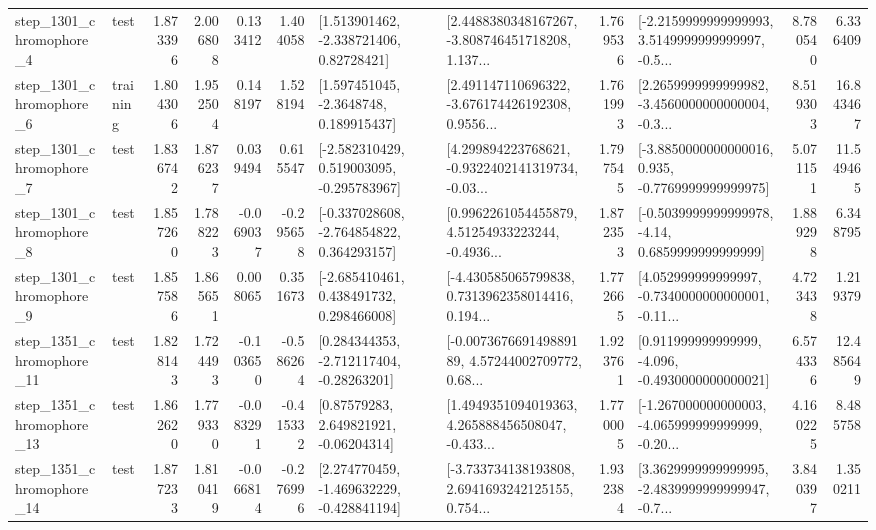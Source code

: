 \begin{tabular}{llrrrrllrlrr}
  step\_1301\_chromophore\_4 &      test &      1.873396 &    2.006808 &      0.133412 &  1.404058 &     [1.513901462, -2.338721406, 0.82728421] &  [2.4488380348167267, -3.808746451718208, 1.137... &       1.769536 &  [-2.2159999999999993, 3.5149999999999997, -0.5... &            8.780540 &          6.336409 \\
  step\_1301\_chromophore\_6 &  training &      1.804306 &    1.952504 &      0.148197 &  1.528194 &      [1.597451045, -2.3648748, 0.189915437] &  [2.491147110696322, -3.676174426192308, 0.9556... &       1.761993 &  [2.2659999999999982, -3.4560000000000004, -0.3... &            8.519303 &         16.843467 \\
  step\_1301\_chromophore\_7 &      test &      1.836742 &    1.876237 &      0.039494 &  0.615547 &   [-2.582310429, 0.519003095, -0.295783967] &  [4.299894223768621, -0.9322402141319734, -0.03... &       1.797545 &  [-3.8850000000000016, 0.935, -0.7769999999999975] &            5.071151 &         11.549465 \\
  step\_1301\_chromophore\_8 &      test &      1.857260 &    1.788223 &     -0.069037 & -0.295658 &   [-0.337028608, -2.764854822, 0.364293157] &  [0.9962261054455879, 4.51254933223244, -0.4936... &       1.872353 &   [-0.5039999999999978, -4.14, 0.6859999999999999] &            1.889298 &          6.348795 \\
  step\_1301\_chromophore\_9 &      test &      1.857586 &    1.865651 &      0.008065 &  0.351673 &    [-2.685410461, 0.438491732, 0.298466008] &  [-4.430585065799838, 0.7313962358014416, 0.194... &       1.772665 &  [4.052999999999997, -0.7340000000000001, -0.11... &            4.723438 &          1.219379 \\
 step\_1351\_chromophore\_11 &      test &      1.828143 &    1.724493 &     -0.103650 & -0.586264 &    [0.284344353, -2.712117404, -0.28263201] &  [-0.007367669149889189, 4.57244002709772, 0.68... &       1.923761 &   [0.911999999999999, -4.096, -0.4930000000000021] &            6.574336 &         12.485649 \\
 step\_1351\_chromophore\_13 &      test &      1.862620 &    1.779330 &     -0.083291 & -0.415332 &      [0.87579283, 2.649821921, -0.06204314] &  [1.4949351094019363, 4.265888456508047, -0.433... &       1.770005 &  [-1.267000000000003, -4.065999999999999, -0.20... &            4.160225 &          8.485758 \\
 step\_1351\_chromophore\_14 &      test &      1.877233 &    1.810419 &     -0.066814 & -0.276996 &   [2.274770459, -1.469632229, -0.428841194] &  [-3.733734138193808, 2.6941693242125155, 0.754... &       1.932384 &  [3.3629999999999995, -2.4839999999999947, -0.7... &            3.840397 &          1.350211 \\

\end{tabular}
